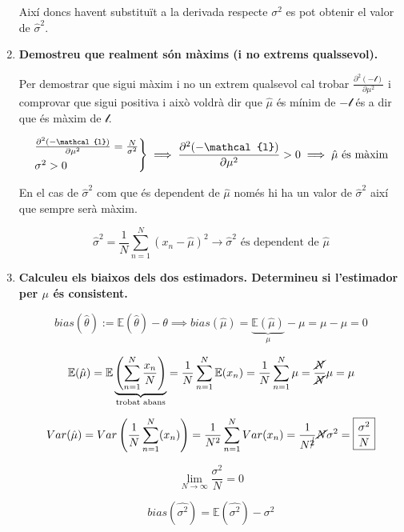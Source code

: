 \documentclass[a4paper]{article}
\begin{document}
\begin{enumerate}
Així doncs havent substituït a la derivada respecte $\sigma^2$ es pot obtenir el valor de $\hat{\sigma}^2$.

\item \textbf{Demostreu que realment són màxims (i no extrems qualssevol).}

Per demostrar que sigui màxim i no un extrem qualsevol cal trobar $\frac{\partial^2(-\mathcal{l})}{\partial \mu^2}$ i comprovar que sigui positiva i això voldrà dir que $\hat{\mu}$ és mínim de $-\mathcal{l}$ és a dir que és màxim de $\mathcal{l}$.

$$
\begin{rcases*}
\frac{\partial^2 (-\mathcal{l})}{\partial \mu^2} = \frac{N}{\sigma^2} \\
\sigma^2 > 0
\end{rcases*}
\implies \frac{\partial^2(-\mathcal{l})}{\partial\mu^2} > 0 \implies \hat{\mu} \text{ és màxim}
$$

En el cas de $\hat{\sigma}^2$ com que és dependent de $\hat{\mu}$ només hi ha un valor de $\hat{\sigma}^2$ així que sempre serà màxim.

$$ \hat{\sigma}^2 = \frac{1}{N} \sum_{n=1}^N (x_n - \hat{\mu})^2 \rightarrow \hat{\sigma}^2 \text{ és dependent de } \hat{\mu}$$

\item \textbf{Calculeu els biaixos dels dos estimadors. Determineu si l'estimador per $\mu$ és consistent.}

$$ bias(\hat{\theta}) := \mathbb{E}(\hat{\theta}) - \theta \implies bias(\hat{\mu}) = \underbrace{\mathbb{E}(\hat{\mu})}_{\mu} - \mu = \mu - \mu = 0 $$

$$ \mathbb{E}(\hat{\mu}) = \mathbb{E}\underbrace{\left(\sum_{n=1}^N \frac{x_n}{N}\right)}_{\text{trobat abans}} = \frac{1}{N}\sum_{n=1}^N \mathbb{E}(x_n) = \frac{1}{N}\sum_{n=1}^N \mu = \frac{\cancel{N}}{\cancel{N}}\mu = \mu$$

$$ Var(\hat{\mu}) = Var\left(\frac{1}{N} \sum_{n=1}^{N}(x_n)\right) = \frac{1}{N^2} \sum_{n=1}^{N}Var(x_n) = \frac{1}{N^{\cancel{2}}}\cancel{N}\sigma^2 = \boxed{\frac{\sigma^2}{N}}  $$

$$\lim_{N\to\infty} \frac{\sigma^2}{N} = 0$$

$$ bias(\hat{\sigma^2}) = \mathbb{E}(\hat{\sigma^2}) - \sigma^2 $$


\end{enumerate}
\end{document}
